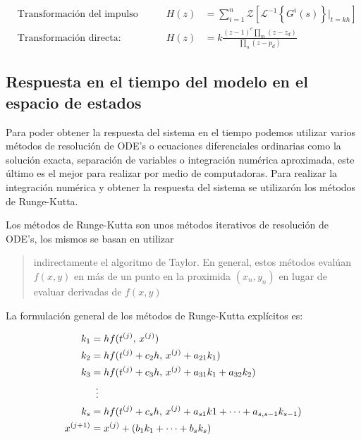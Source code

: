             \begin{align}
                &\text{Transformación del impulso invariante:}& H(z) &= \sum_{i=1}^{n}\mathcal{Z} \left[ \mathcal{L}^{-1}\left\lbrace G^{i}(s)\right\rbrace\Bigr|_{t=kh}\right] \label{eq:impulsinal}\\[15pt]
                &\text{Transformación directa:}& H(z) &=  k \frac{(z-1)^e\displaystyle\prod_m (z-z_d)}{\displaystyle\prod_n (z-p_d)} \label{eq:directa}
            \end{align}

    
    \subsection{Respuesta en el tiempo del modelo en el espacio de estados}
        
        Para poder obtener la respuesta del sistema en el tiempo podemos utilizar varios métodos de resolución de ODE's o ecuaciones diferenciales ordinarias como la solución exacta, separación de variables o integración numérica aproximada, este último es el mejor para realizar por medio de computadoras. Para realizar la integración numérica y obtener la respuesta del sistema se utilizarón los métodos de Runge-Kutta.

        Los métodos de Runge-Kutta son unos métodos iterativos de resolución de ODE's, los mismos se basan en utilizar \blockquote[{\cite[p.31]{horacio1997metodos}}]{indirectamente el algoritmo de Taylor. En general, estos métodos evalúan $f(x,y)$ en más de un punto en la proximida $(x_n,y_n)$ en lugar de evaluar derivadas de $f(x,y)$}. La formulación general de los métodos de Runge-Kutta explícitos es:    
        
        \begin{equation}\label{eq:RKgeneral}
            \begin{aligned}
                k_1 &= hf(t^{(j)},\,x^{(j)})\\
                k_2 &= hf(t^{(j)} + c_2 h,\,x^{(j)} + a_{21}k_1)\\
                k_3 &= hf(t^{(j)} + c_3 h,\,x^{(j)} + a_{31}k_1 + a_{32}k_2)\\
                &\mathrel{\makebox[\widthof{=}]{\vdots}}\\
                k_s &= hf(t^{(j)} + c_s h,\,x^{(j)} + a_{s1}k1 + \cdots +  a_{s,s-1}k_{s-1})\\
                x^{(j+1)} &= x^{(j)} + (b_1 k_1 + \cdots + b_s k_s)
            \end{aligned}
        \end{equation}
        
